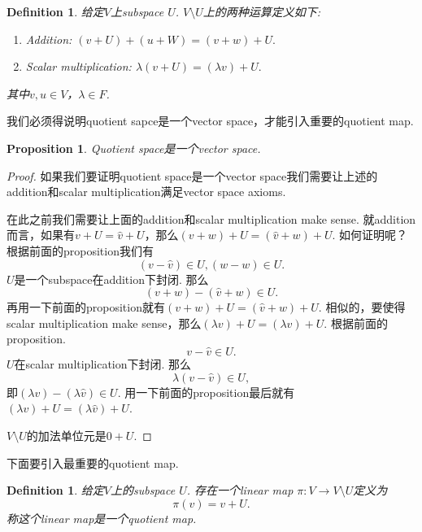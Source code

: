 \documentclass{article}
\newtheorem{proposition}[theorem]{Proposition}
\newtheorem{definition}[theorem]{Definition}
\newcommand*{\xfunc}[4]{{#2}\colon{#3}{#1}{#4}}
\newcommand*{\func}[3]{\xfunc{\to}{#1}{#2}{#3}}
\begin{document}
\begin{definition}
\rm 给定$V$上subspace $U$. $V \setminus U$上的两种运算定义如下:
\begin{enumerate}
	\item Addition: $(v+U) + (u +W) = (v+w) + U.$
	\item Scalar multiplication: $\lambda(v+U)=(\lambda v)+U.$ 
\end{enumerate}
其中$v,u \in V$，$\lambda \in F$.
\end{definition}


{\color{blue} 我们必须得说明quotient sapce是一个vector space，才能引入重要的quotient map}.
\begin{proposition}
\rm Quotient space是一个vector space.
\end{proposition}

\begin{proof}

如果我们要证明quotient space是一个vector space我们需要让上述的addition和scalar multiplication满足vector space axioms.

在此之前我们需要让上面的addition和scalar multiplication make sense. 就addition而言，如果有$v+U = \widehat{v} + U$，那么$(v+w)+U = (\widehat{v}+w)+U$. 如何证明呢？根据前面的proposition我们有
$$
(v-\widehat{v}) \in U , (w-w) \in U.
$$
$U$是一个subspace在addition下封闭. 那么
$$
(v+w)-(\widehat{v}+w) \in U.
$$
再用一下前面的proposition就有$(v+w)+U = (\widehat{v}+w)+U$. 相似的，要使得scalar multiplication make sense，那么$(\lambda v) + U = (\lambda \widehat{v}) + U$. 根据前面的proposition.
$$
v-\widehat{v} \in U.
$$ 
$U$在scalar multiplication下封闭. 那么
$$
\lambda(v-\widehat{v}) \in U,
$$
即$(\lambda v) - (\lambda \widehat{v}) \in U$. 用一下前面的proposition最后就有$(\lambda v) + U = (\lambda \widehat{v}) + U$.

$V\setminus U$的加法单位元是$0 + U$. 
\end{proof}

{\color{red} 下面要引入最重要的quotient map}.

\begin{definition}
\rm 给定$V$上的subspace $U$. 存在一个linear map $\func{\pi}{V}{V\setminus U}$定义为
$$
\pi(v) = v+U.
$$
称这个linear map是一个quotient map.
\end{definition}
\end{document}
